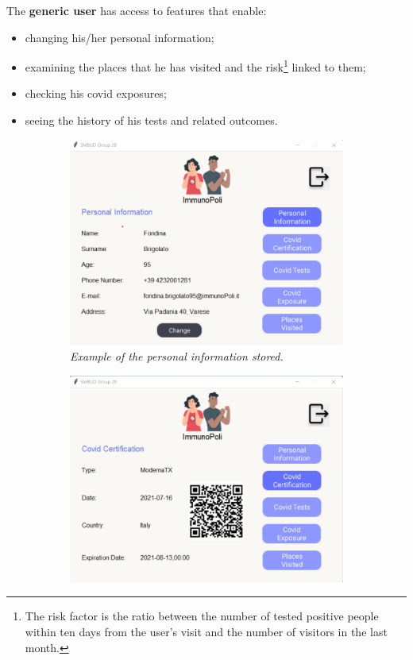\noindent
The \textbf{generic user} has access to features that enable:
\begin{itemize}
    \item changing his/her personal information;
    \item examining the places that he has visited and the risk\footnote{The risk factor is the ratio between the number of tested positive people within ten days from the user's visit and the number of visitors in the last month.} linked to them;
    \item checking his covid exposures;
    \item seeing the history of his tests and related outcomes.
\end{itemize}

\begin{figure}[h]
    \begin{subfigure}{.5\textwidth}
        \centering
        \includegraphics[width=\linewidth]{images/application_screenshots/user_information_page.png}  
  \caption{\textit{Example of the personal information stored.}}
  \label{fig: personal_information}
\end{subfigure}
\begin{subfigure}{.5\textwidth}
  \centering
  \includegraphics[width=\linewidth]{images/application_screenshots/covid_certification.png}  

\end{subfigure}
\end{figure}
